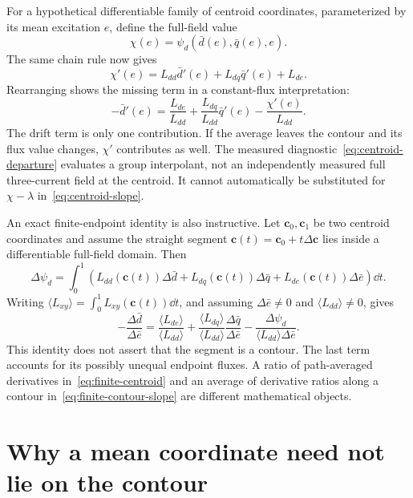 For a hypothetical differentiable family of centroid coordinates, parameterized by its mean excitation $e$, define the full-field value
\begin{equation}
\chi(e)=\psi_d(\bar d(e),\bar q(e),e).
\end{equation}
The same chain rule now gives
\begin{equation}
\chi'(e)=L_{dd}\bar d'(e)+L_{dq}\bar q'(e)+L_{de}.
\end{equation}
Rearranging shows the missing term in a constant-flux interpretation:
\begin{equation}\label{eq:centroid-slope}
-\bar d'(e)=\frac{L_{de}}{L_{dd}}
+\frac{L_{dq}}{L_{dd}}\bar q'(e)-\frac{\chi'(e)}{L_{dd}}.
\end{equation}
The drift term is only one contribution. If the average leaves the contour and its flux value changes, $\chi'$ contributes as well. The measured diagnostic~\eqref{eq:centroid-departure} evaluates a group interpolant, not an independently measured full three-current field at the centroid. It cannot automatically be substituted for $\chi-\lambda$ in~\eqref{eq:centroid-slope}.

An exact finite-endpoint identity is also instructive. Let $\bm c_0,\bm c_1$ be two centroid coordinates and assume the straight segment $\bm c(t)=\bm c_0+t\Delta\bm c$ lies inside a differentiable full-field domain. Then
\begin{equation}
\Delta\psi_d=\int_0^1
\left(L_{dd}(\bm c(t))\Delta\bar d+
L_{dq}(\bm c(t))\Delta\bar q+
L_{de}(\bm c(t))\Delta\bar e\right)\dd t.
\end{equation}
Writing $\langle L_{xy}\rangle=\int_0^1L_{xy}(\bm c(t))\dd t$, and assuming $\Delta\bar e\ne0$ and $\langle L_{dd}\rangle\ne0$, gives
\begin{equation}\label{eq:finite-centroid}
-\frac{\Delta\bar d}{\Delta\bar e}
=\frac{\langle L_{de}\rangle}{\langle L_{dd}\rangle}
+\frac{\langle L_{dq}\rangle}{\langle L_{dd}\rangle}
\frac{\Delta\bar q}{\Delta\bar e}
-\frac{\Delta\psi_d}{\langle L_{dd}\rangle\Delta\bar e}.
\end{equation}
This identity does not assert that the segment is a contour. The last term accounts for its possibly unequal endpoint fluxes. A ratio of path-averaged derivatives in~\eqref{eq:finite-centroid} and an average of derivative ratios along a contour in~\eqref{eq:finite-contour-slope} are different mathematical objects.

\section{Why a mean coordinate need not lie on the contour}
